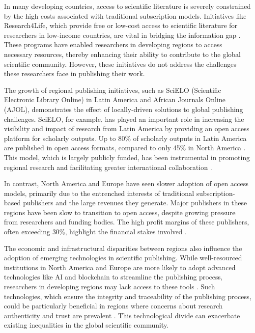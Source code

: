 \documentclass{article}
\begin{document}
In many developing countries, access to scientific literature is severely  constrained by the high costs associated with traditional subscription models. Initiatives like Research4Life, which provide free or low-cost access to scientific literature for researchers in low-income countries, are vital in bridging the information gap \cite{research4life}. These programs have enabled researchers in developing regions to access necessary resources, thereby enhancing their ability to contribute to the global scientific community. However, these initiatives do not address the challenges these researchers face in publishing their work.

The growth of regional publishing initiatives, such as SciELO (Scientific Electronic Library Online) in Latin America and African Journals Online (AJOL), demonstrates the effect of locally-driven solutions to global publishing challenges. SciELO, for example, has played an important role in increasing the visibility and impact of research from Latin America by providing an open access platform for scholarly outputs. Up to 80\% of scholarly outputs in Latin America are published in open access formats, compared to only 45\% in North America \cite{international2022stm}. This model, which is largely publicly funded, has been instrumental in promoting regional research and facilitating greater international collaboration \cite{packer2014scielo}.

In contrast, North America and Europe have seen slower adoption of open access models, primarily due to the entrenched interests of traditional subscription-based publishers and the large revenues they generate. Major publishers in these regions have been slow to transition to open access, despite growing pressure from researchers and funding bodies. The high profit margins of these publishers, often exceeding 30\%, highlight the financial stakes involved \cite{buranyi2017profitable}.

The economic and infrastructural disparities between regions also influence the adoption of emerging technologies in scientific publishing. While well-resourced institutions in North America and Europe are more likely to adopt advanced technologies like AI and blockchain to streamline the publishing process, researchers in developing regions may lack access to these tools \cite{heaven2018ai}. Such technologies, which ensure the integrity and traceability of the publishing process, could be particularly beneficial in regions where concerns about research authenticity and trust are prevalent \cite{van2017blockchain}. This technological divide can exacerbate existing inequalities in the global scientific community.
\end{document}
